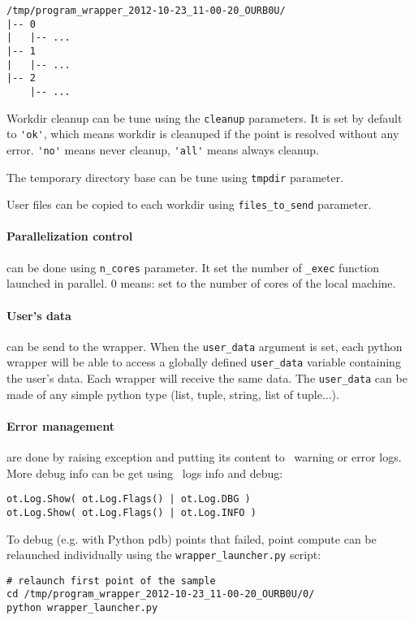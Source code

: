 \begin{lstlisting}
/tmp/program_wrapper_2012-10-23_11-00-20_OURB0U/
|-- 0
|   |-- ...
|-- 1
|   |-- ...
|-- 2
    |-- ...
\end{lstlisting}

Workdir cleanup can be tune using the \verb|cleanup| parameters. It is set by default to \verb|'ok'|, which means workdir is cleanuped if the point is resolved without any error. \verb|'no'| means never cleanup, \verb|'all'| means always cleanup.

The temporary directory base can be tune using \verb|tmpdir| parameter.

User files can be copied to each workdir using \verb|files_to_send| parameter.


\paragraph{Parallelization control} can be done using \verb|n_cores| parameter. It set the number of \verb|_exec| function launched in parallel. 0 means: set to the number of cores of the local machine.

\paragraph{User's data} can be send to the wrapper. When the \verb|user_data| argument is set, each python wrapper will be able to access a globally defined \verb|user_data| variable containing the user's data. Each wrapper will receive the same data. The \verb|user_data| can be made of any simple python type (list, tuple, string, list of tuple...). 

\paragraph{Error management} are done by raising exception and putting its content to \OT\ warning or error logs.
More debug info can be get using \OT\ logs info and debug:
\begin{lstlisting}
ot.Log.Show( ot.Log.Flags() | ot.Log.DBG )
ot.Log.Show( ot.Log.Flags() | ot.Log.INFO )
\end{lstlisting}

To debug (e.g. with Python pdb) points that failed, point compute can be relaunched individually using the \verb|wrapper_launcher.py| script:
\begin{lstlisting}
# relaunch first point of the sample
cd /tmp/program_wrapper_2012-10-23_11-00-20_OURB0U/0/
python wrapper_launcher.py
\end{lstlisting}

